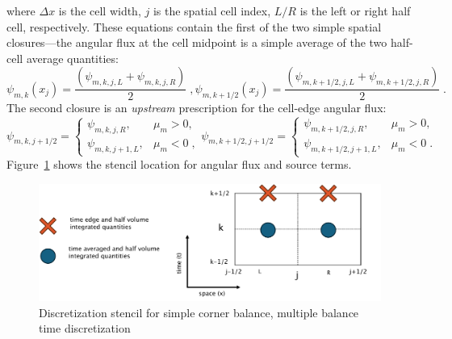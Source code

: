 where $\Delta x$ is the cell width, $j$ is the spatial cell index, $L/R$ is the left or right half cell, respectively.
These equations contain the first of the two simple spatial closures---the angular flux at the cell midpoint is a simple average of the two half-cell average quantities:
\begin{subequations}
\begin{equation}
  \psi_{m,k}(x_j) =  \frac{\left( \psi_{m,k,j,L} + \psi_{m,k,j,R} \right)}{2} \;,
\end{equation}
\begin{equation}
  \psi_{m,k+1/2}(x_j) =  \frac{\left( \psi_{m,k+1/2,j,L} + \psi_{m,k+1/2,j,R} \right)}{2} \;.
\end{equation}
\end{subequations}
The second closure is an \textit{upstream} prescription for the cell-edge angular flux:
\begin{subequations}
\begin{equation}
  \psi_{m,k,j+1/2} =
  \begin{cases}
  \psi_{m,k,j,R}, & \mu_m > 0, \\
  \psi_{m,k,j+1,L}, & \mu_m < 0 \;,
  \end{cases}
\end{equation}
\begin{equation}
  \psi_{m,k+1/2,j+1/2} =
  \begin{cases}
  \psi_{m,k+1/2,j,R}, & \mu_m > 0, \\
  \psi_{m,k+1/2,j+1,L}, & \mu_m < 0 \;.
  \end{cases}
\end{equation}
\end{subequations}
Figure~\ref{fig:stencil} shows the stencil location for angular flux and source terms. 
\begin{figure}
    \centering
    \includegraphics[width=\textwidth]{deterministic/therefore_paper/therefore_figs/stencil.pdf}
    \caption{Discretization stencil for simple corner balance, multiple balance time discretization}
    \label{fig:stencil}
\end{figure}

